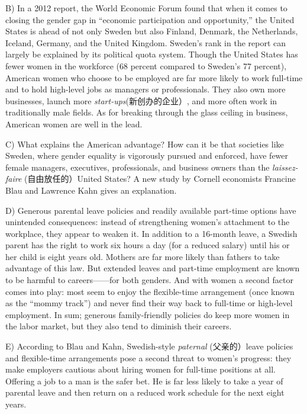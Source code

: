\documentclass[UTF8,11pt]{ctexart}
\begin{document}
B) In a 2012 report, the World Economic Forum found that when it comes to closing the gender gap in “economic participation and opportunity,” the United States is ahead of not only Sweden but also Finland, Denmark, the Netherlands, Iceland, Germany, and the United Kingdom. Sweden’s rank in the report can largely be explained by its political quota system. Though the United States has fewer women in the workforce (68 percent compared to Sweden’s 77 percent), American women who choose to be employed are far more likely to work full-time and to hold high-level jobs as managers or professionals. They also own more businesses, launch more\textit{ start-ups}(新创办的企业）, and more often work in traditionally male fields. As for breaking through the glass ceiling in business, American women are well in the lead.


C) What explains the American advantage? How can it be that societies like Sweden, where gender equality is vigorously pursued and enforced, have fewer female managers, executives, professionals, and business owners than the\textit{ laissez-faire} (自由放任的）United States? A new study by Cornell economists Francine Blau and Lawrence Kahn gives an explanation.


D) Generous parental leave policies and readily available part-time options have unintended consequences: instead of strengthening women’s attachment to the workplace, they appear to weaken it. In addition to a 16-month leave, a Swedish parent has the right to work six hours a day (for a reduced salary) until his or her child is eight years old. Mothers are far more likely than fathers to take advantage of this law. But extended leaves and part-time employment are known to be harmful to careers——for both genders. And with women a second factor comes into play: most seem to enjoy the flexible-time arrangement (once known as the “mommy track”) and never find their way back to full-time or high-level employment. In sum; generous family-friendly policies do keep more women in the labor market, but they also tend to diminish their careers.


E) According to Blau and Kahn, Swedish-style\textit{ paternal} (父亲的）leave policies and flexible-time arrangements pose a second threat to women’s progress: they make employers cautious about hiring women for full-time positions at all. Offering a job to a man is the safer bet. He is far less likely to take a year of parental leave and then return on a reduced work schedule for the next eight years.
\end{document}
